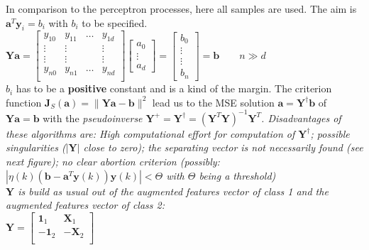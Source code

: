     In comparison to the perceptron processes, here all samples are used. 
    The aim is $\bm a^T \bm y_i = b_i$ with $b_i$ to be specified. \\
    $\bm Y \bm a = \begin{bmatrix}
      y_{10} & y_{11} & \ldots & y_{1d}\\
      \vdots &\vdots & & \vdots\\
      \vdots &\vdots & & \vdots\\
      y_{n0} & y_{n1} & \ldots & y_{nd}\\
    \end{bmatrix}
    \begin{bmatrix}
    	a_0\\
    	\vdots\\
    	a_d
    \end{bmatrix} = 
    \begin{bmatrix}
    	b_0\\
    	\vdots\\
    	\vdots\\
    	b_n
    \end{bmatrix} = \bm b \qquad n \gg d$\\
    $b_i$ has to be a \textbf{positive} constant and is a kind of the margin. The criterion function 
    $\bm J_S(\bm a)=\|\bm Y \bm a - \bm b \|^2$ lead 
    us to the MSE solution $\bm a=\bm Y^\dagger \bm b$ of $\bm Y \bm a = \bm b$ 
    with the \em pseudoinverse \em $\bm Y^+= \bm Y^\dagger = (\bm Y^T \bm Y)^{-1} \bm Y^T$.
    Disadvantages of these algorithms are: High computational effort for computation of $\bm Y^\dagger$;
    possible singularities ($|\bm Y|$ close to zero); the separating vector is not necessarily found (see next figure);
    no clear abortion criterion (possibly: $|\eta(k) (\bm b - \bm a^T \bm y(k)) \bm y(k)| < \Theta$ with $\Theta$ being a threshold)\\
    
    $\bm Y$ is build as usual out of the augmented features vector of class 1 and the augmented features vector of class 2:\\
    $\bm Y = \begin{bmatrix}
    \bm 1_1 & \bm X_1 \\
    - \bm 1_2 & -\bm X_2  \\
    \end{bmatrix}$
    
    
    

